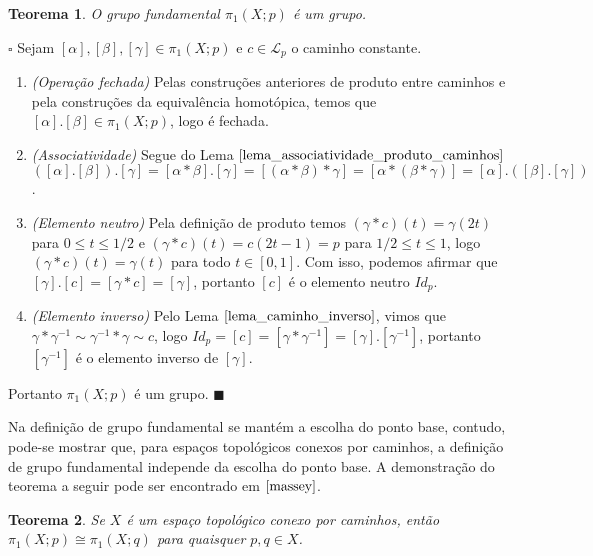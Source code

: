 \documentclass[12pt]{book}
\newtheorem{teorema}{Teorema}[section]
\newenvironment{prova}[1]{$\square$ #1}{\hfill$\blacksquare$}
\newcommand{\caminhos}{\mathcal{L}}
\newcommand{\caminhospontobase}[1]{\caminhos_{#1}}
\newcommand{\classe}[1]{[#1]}
\newcommand{\grupofundamentalpontobase}[2]{\pi_{1}(#1; #2)}
\newcommand{\intervalo}{[0,1]}
\begin{document}
	\begin{teorema}
		O grupo fundamental $\grupofundamentalpontobase{X}{p}$ é um grupo.
	\end{teorema}
	\begin{prova}
		Sejam $\classe{\alpha}, \classe{\beta}, \classe{\gamma} \in  \grupofundamentalpontobase{X}{p}$ e $c\in \caminhospontobase{p}$ o caminho constante.
		\begin{enumerate}
			\item \textit{(Operação fechada)} Pelas construções anteriores de produto entre caminhos e pela construções da equivalência homotópica, temos que $\classe{\alpha}.\classe{\beta} \in \grupofundamentalpontobase{X}{p}$, logo é fechada.
			\item \textit{(Associatividade)} Segue do Lema $\ref{lema_associatividade_produto_caminhos}$ $(\classe{\alpha}. \classe{\beta}). \classe{\gamma} = \classe{\alpha*\beta}. \classe{\gamma} = \classe{(\alpha*\beta)*\gamma} = \classe{\alpha*(\beta*\gamma)} = \classe{\alpha}. (\classe{\beta}. \classe{\gamma} )$.
			\item \textit{(Elemento neutro)} Pela definição de produto temos $(\gamma*c)(t) = \gamma(2t)$ para $0\leq t \leq 1/2$ e  $(\gamma*c)(t) = c(2t-1) = p$ para $1/2 \leq t \leq 1$, logo $(\gamma*c)(t) = \gamma(t)$ para todo $t \in \intervalo$. Com isso, podemos afirmar que $\classe{\gamma}.\classe{c} = \classe{\gamma*c} = \classe{\gamma}$, portanto $\classe{c}$ é o elemento neutro $Id_{p}$.
			\item \textit{(Elemento inverso)} Pelo Lema $\ref{lema_caminho_inverso}$, vimos que $\gamma *\gamma^{-1} \sim \gamma^{-1} *\gamma \sim c$, logo $Id_{p} =\classe{c} =  \classe{\gamma*\gamma^{-1}} = \classe{\gamma}.\classe{\gamma^{-1}}$, portanto $\classe{\gamma^{-1}}$ é o elemento inverso de $\classe{\gamma}$.
		\end{enumerate}
		Portanto $\grupofundamentalpontobase{X}{p}$ é um grupo.
	\end{prova}
	
	Na definição de grupo fundamental se mantém a escolha do ponto base, contudo, pode-se mostrar que, para espaços topológicos conexos por caminhos, a definição de grupo fundamental independe da escolha do ponto base. A demonstração do teorema a seguir pode ser encontrado em $\cite{massey}$.
	
	\begin{teorema}
		Se $X$ é um espaço topológico conexo por caminhos, então $\grupofundamentalpontobase{X}{p} \cong \grupofundamentalpontobase{X}{q}$ para quaisquer $p,q \in X$.
	\end{teorema}
	
\end{document}
